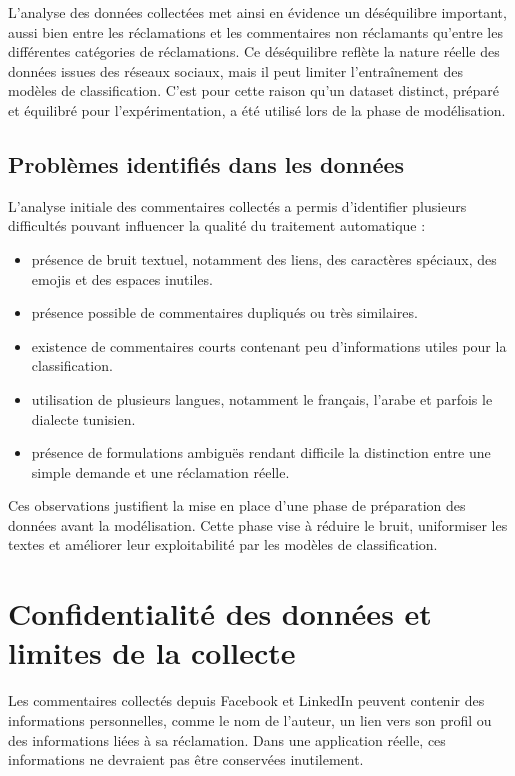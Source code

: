 \documentclass[12pt,a4paper,oneside]{report}
\begin{document}
L'analyse des données collectées met ainsi en évidence un déséquilibre
important, aussi bien entre les réclamations et les commentaires non
réclamants qu'entre les différentes catégories de réclamations. Ce
déséquilibre reflète la nature réelle des données issues des réseaux sociaux, mais il peut limiter l'entraînement des modèles de classification. C'est pour cette raison qu'un dataset distinct, préparé et équilibré pour l'expérimentation, a été utilisé lors de la phase de modélisation.

\subsection{Problèmes identifiés dans les données}

L'analyse initiale des commentaires collectés a permis d'identifier plusieurs difficultés pouvant influencer la qualité du traitement automatique :

\begin{itemize}
    \item présence de bruit textuel, notamment des liens, des caractères spéciaux, des emojis et des espaces inutiles.
    \item présence possible de commentaires dupliqués ou très similaires.
    \item existence de commentaires courts contenant peu d'informations utiles pour la classification.
    \item utilisation de plusieurs langues, notamment le français, l'arabe et parfois le dialecte tunisien.
    \item présence de formulations ambiguës rendant difficile la distinction entre une simple demande et une réclamation réelle.
\end{itemize}

Ces observations justifient la mise en place d'une phase de préparation des données avant la modélisation. Cette phase vise à réduire le bruit, uniformiser les textes et améliorer leur exploitabilité par les modèles de classification.

\section{Confidentialité des données et limites de la collecte}

Les commentaires collectés depuis Facebook et LinkedIn peuvent contenir des informations personnelles, comme le nom de l'auteur, un lien vers son profil ou des informations liées à sa réclamation. Dans une application réelle, ces informations ne devraient pas être conservées inutilement.
\end{document}
